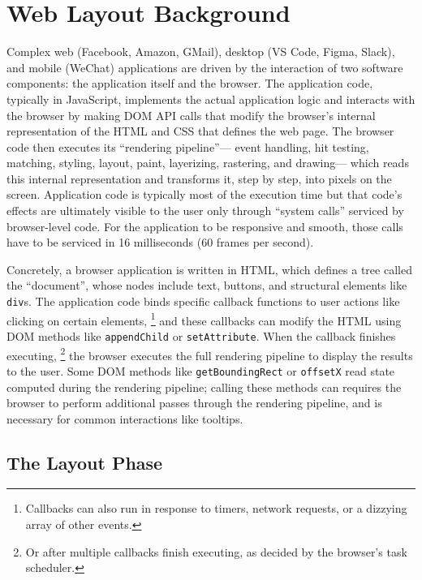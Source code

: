 \section{Web Layout Background}

Complex
  web (Facebook, Amazon, GMail),
  desktop (VS Code, Figma, Slack),
  and mobile (WeChat) applications
  are driven by the interaction of two software components:
  the application itself and the browser.
The application code, typically in JavaScript,
  implements the actual application logic and
  interacts with the browser by making DOM API calls
  that modify the browser's internal representation
  of the HTML and CSS that defines the web page.
The browser code then executes its ``rendering pipeline''---%
  event handling, hit testing, matching, styling,
  layout, paint, layerizing, rastering, and drawing---%
  which reads this internal representation and transforms it,
  step by step, into pixels on the screen.
Application code is typically most of the execution time
  but that code's effects are ultimately visible to the user
  only through ``system calls'' serviced by browser-level code.
For the application to be responsive and smooth,
  those calls  have to be serviced
  in 16 milliseconds (60 frames per second).

Concretely, a browser application is written in HTML,
  which defines a tree called the ``document'',
  whose nodes include text, buttons,
  and structural elements like \texttt{div}s.
The application code binds specific callback functions
  to user actions like clicking on certain elements,%
  \footnote{Callbacks can also run in response to
    timers, network requests, or a dizzying array of
    other events.}
  and these callbacks can modify the HTML using DOM methods
  like \texttt{appendChild} or \texttt{setAttribute}.
When the callback finishes executing,%
\footnote{Or after multiple callbacks finish executing,
  as decided by the browser's task scheduler.}
  the browser executes the full rendering pipeline
  to display the results to the user.
Some DOM methods like
  \texttt{getBoundingRect} or \texttt{offsetX}
  read state computed during the rendering pipeline;
  calling these methods can requires the browser
  to perform additional passes through the rendering pipeline,
  and is necessary for common interactions like tooltips.

\subsection{The Layout Phase}

